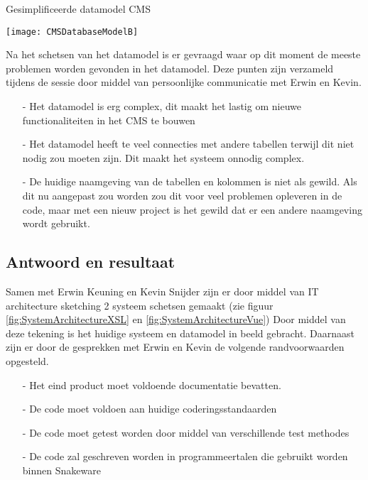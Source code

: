 \whitespace
\begin{graphic}
	\captionsetup{type=figure}
	\caption{Gesimplificeerde datamodel CMS}
	\texttt{[image: CMSDatabaseModelB]}
	\label{fig:DatamodelCMS}
\end{graphic}

\whitespace[2]
Na het schetsen van het datamodel is er gevraagd waar op dit moment de meeste problemen worden gevonden in het datamodel.
Deze punten zijn verzameld tijdens de sessie door middel van persoonlijke communicatie met Erwin en Kevin.
\begin{itemize}
    \item[-]{Het datamodel is erg complex, dit maakt het lastig om nieuwe functionaliteiten in het CMS te bouwen}
    \item[-]{Het datamodel heeft te veel connecties met andere tabellen terwijl dit niet nodig zou moeten zijn.
        Dit maakt het systeem onnodig complex.}
    \item[-]{De huidige naamgeving van de tabellen en kolommen is niet als gewild.
            Als dit nu aangepast zou worden zou dit voor veel problemen opleveren in de code, maar met een nieuw project is het gewild dat er een andere naamgeving wordt gebruikt.}
\end{itemize} 
%

\subsection{Antwoord en resultaat}
Samen met Erwin Keuning en Kevin Snijder zijn er door middel van IT architecture sketching 2 systeem schetsen gemaakt (zie figuur \ref{fig:SystemArchitectureXSL} en \ref{fig:SystemArchitectureVue})
Door middel van deze tekening is het huidige systeem en datamodel in beeld gebracht.
Daarnaast zijn er door de gesprekken met Erwin en Kevin de volgende randvoorwaarden opgesteld.

\begin{itemize}
    \item[-]{Het eind product moet voldoende documentatie bevatten.}
    \item[-]{De code moet voldoen aan huidige coderingsstandaarden}
    \item[-]{De code moet getest worden door middel van verschillende test methodes}
    \item[-]{De code zal geschreven worden in programmeertalen die gebruikt worden binnen Snakeware}
\end{itemize}

